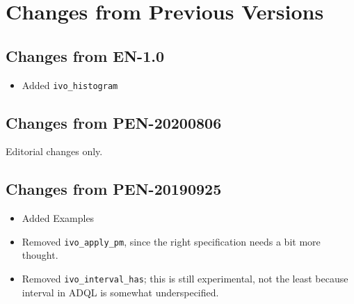 \documentclass[11pt,a4paper]{ivoa}
\begin{document}
\section{Changes from Previous Versions}

\subsection{Changes from EN-1.0}

\begin{itemize}
\item Added \verb|ivo_histogram|
\end{itemize}

\subsection{Changes from PEN-20200806}

Editorial changes only.

\subsection{Changes from PEN-20190925}

\begin{itemize}
\item Added Examples
\item Removed \verb|ivo_apply_pm|, since the right specification needs a
bit more thought.
\item Removed \verb|ivo_interval_has|; this is still experimental, not
the least because interval in ADQL is somewhat underspecified.
\end{itemize}


\end{document}
